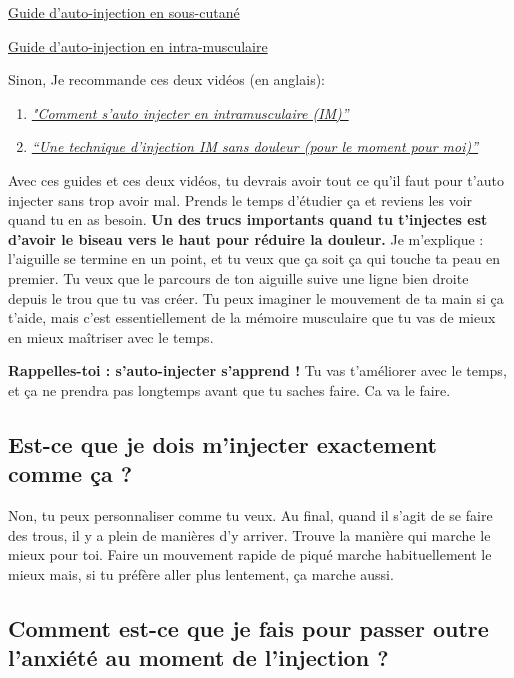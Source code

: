 \documentclass{article}
\begin{document}
\href{https://tr.ee/6xXjjsMtPj}{Guide d'auto-injection en sous-cutané}

\href{https://tr.ee/PEeuyOWzvo}{Guide d'auto-injection en intra-musculaire}

Sinon, Je recommande ces deux vidéos (en anglais):

\begin{enumerate}
  \item \href{https://www.youtube.com/watch?v=cBabaGC2Dok}{\textit{"Comment s'auto injecter en intramusculaire (IM)”}}
  \item \href{https://www.youtube.com/watch?v=YfNlAZLxLyw}{\textit{“Une technique d'injection IM sans douleur (pour le moment pour moi)”}}
\end{enumerate}

Avec ces guides et ces deux vidéos, tu devrais avoir tout ce qu'il faut pour t'auto injecter sans trop avoir mal. Prends le temps d'étudier ça et reviens les voir quand tu en as besoin. \textbf{Un des trucs importants quand tu t'injectes est d'avoir le biseau vers le haut pour réduire la douleur.} Je m'explique : l'aiguille se termine en un point, et tu veux que ça soit ça qui touche ta peau en premier. Tu veux que le parcours de ton aiguille suive une ligne bien droite depuis le trou que tu vas créer. Tu peux imaginer le mouvement de ta main si ça t'aide, mais c'est essentiellement de la mémoire musculaire que tu vas de mieux en mieux maîtriser avec le temps.

\textbf{Rappelles-toi : s'auto-injecter s'apprend ! } Tu vas t'améliorer avec le temps, et ça ne prendra pas longtemps avant que tu saches faire. Ca va le faire.

\subsection{Est-ce que je dois m'injecter exactement comme ça ?}

Non, tu peux personnaliser comme tu veux. Au final, quand il s'agit de se faire des trous, il y a plein de manières d'y arriver. Trouve la manière qui marche le mieux pour toi. Faire un mouvement rapide de piqué marche habituellement le mieux mais, si tu préfère aller plus lentement, ça marche aussi. 

\subsection{Comment est-ce que je fais pour passer outre l'anxiété au moment de l'injection ?}
\end{document}
